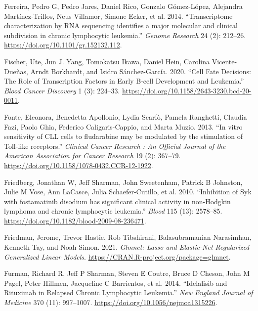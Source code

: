 \documentclass[11pt, a4paper, twosided]{book}
\newenvironment{CSLReferences}%
  {}%
  {\par}
\begin{document}
\begin{CSLReferences}{1}{0}
\leavevmode{}%
Ferreira, Pedro G, Pedro Jares, Daniel Rico, Gonzalo Gómez-López, Alejandra Martínez-Trillos, Neus Villamor, Simone Ecker, et al. 2014. {``{Transcriptome characterization by RNA sequencing identifies a major molecular and clinical subdivision in chronic lymphocytic leukemia}.''} \emph{Genome Research} 24 (2): 212--26. \url{https://doi.org/10.1101/gr.152132.112}.

\leavevmode{}%
Fischer, Ute, Jun J. Yang, Tomokatsu Ikawa, Daniel Hein, Carolina Vicente-Dueñas, Arndt Borkhardt, and Isidro Sánchez-García. 2020. {``{Cell Fate Decisions: The Role of Transcription Factors in Early B-cell Development and Leukemia}.''} \emph{Blood Cancer Discovery} 1 (3): 224--33. \url{https://doi.org/10.1158/2643-3230.bcd-20-0011}.

\leavevmode{}%
Fonte, Eleonora, Benedetta Apollonio, Lydia Scarfò, Pamela Ranghetti, Claudia Fazi, Paolo Ghia, Federico Caligaris-Cappio, and Marta Muzio. 2013. {``{In vitro sensitivity of CLL cells to fludarabine may be modulated by the stimulation of Toll-like receptors.}''} \emph{Clinical Cancer Research : An Official Journal of the American Association for Cancer Research} 19 (2): 367--79. \url{https://doi.org/10.1158/1078-0432.CCR-12-1922}.

\leavevmode{}%
Friedberg, Jonathan W, Jeff Sharman, John Sweetenham, Patrick B Johnston, Julie M Vose, Ann LaCasce, Julia Schaefer-Cutillo, et al. 2010. {``{Inhibition of Syk with fostamatinib disodium has significant clinical activity in non-Hodgkin lymphoma and chronic lymphocytic leukemia}.''} \emph{Blood} 115 (13): 2578--85. \url{https://doi.org/10.1182/blood-2009-08-236471}.

\leavevmode{}%
Friedman, Jerome, Trevor Hastie, Rob Tibshirani, Balasubramanian Narasimhan, Kenneth Tay, and Noah Simon. 2021. \emph{Glmnet: Lasso and Elastic-Net Regularized Generalized Linear Models}. \url{https://CRAN.R-project.org/package=glmnet}.

\leavevmode{}%
Furman, Richard R, Jeff P Sharman, Steven E Coutre, Bruce D Cheson, John M Pagel, Peter Hillmen, Jacqueline C Barrientos, et al. 2014. {``{Idelalisib and Rituximab in Relapsed Chronic Lymphocytic Leukemia}.''} \emph{New England Journal of Medicine} 370 (11): 997--1007. \url{https://doi.org/10.1056/nejmoa1315226}.


\end{CSLReferences}
\end{document}
